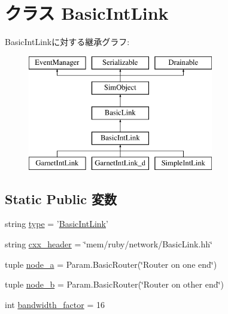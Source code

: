 \hypertarget{classBasicLink_1_1BasicIntLink}{
\section{クラス BasicIntLink}
\label{classBasicLink_1_1BasicIntLink}
}
BasicIntLinkに対する継承グラフ:\begin{figure}[H]
\begin{center}
\leavevmode
\includegraphics[height=5cm]{classBasicLink_1_1BasicIntLink}
\end{center}
\end{figure}
\subsection*{Static Public 変数}
\begin{DoxyCompactItemize}
\item 
string \hyperlink{classBasicLink_1_1BasicIntLink_acce15679d830831b0bbe8ebc2a60b2ca}{type} = '\hyperlink{classBasicLink_1_1BasicIntLink}{BasicIntLink}'
\item 
string \hyperlink{classBasicLink_1_1BasicIntLink_a17da7064bc5c518791f0c891eff05fda}{cxx\_\-header} = \char`\"{}mem/ruby/network/BasicLink.hh\char`\"{}
\item 
tuple \hyperlink{classBasicLink_1_1BasicIntLink_ac6e1b551c7101b4055dd84baacf1366b}{node\_\-a} = Param.BasicRouter(\char`\"{}Router on one end\char`\"{})
\item 
tuple \hyperlink{classBasicLink_1_1BasicIntLink_a889e9decbcff3aac7e218b6a38b0854b}{node\_\-b} = Param.BasicRouter(\char`\"{}Router on other end\char`\"{})
\item 
int \hyperlink{classBasicLink_1_1BasicIntLink_affbbb1b5f39453ff2abf6f5ae9385606}{bandwidth\_\-factor} = 16
\end{DoxyCompactItemize}


